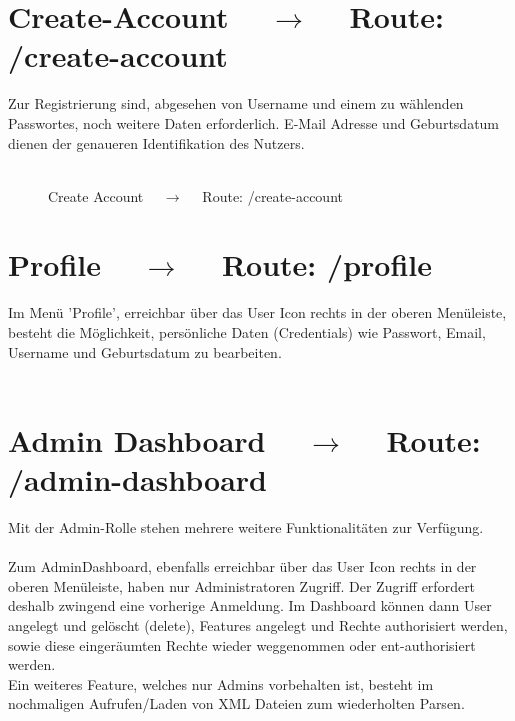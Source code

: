 \documentclass[10pt]{report}
\begin{document}
\section{Create-Account $\quad\rightarrow\quad$  Route:  /create-account}  	
	
\noindent  Zur Registrierung sind, abgesehen von Username und einem zu wählenden Passwortes, noch weitere Daten erforderlich. E-Mail Adresse und Geburtsdatum dienen der genaueren Identifikation des Nutzers.\\\\
\begin{figure}[H]
	\begin{center}		
  	 \end{center}
	\caption{Create Account $\quad\rightarrow\quad$  Route:  /create-account}	
 \end{figure}



\section{Profile $\quad\rightarrow\quad$  Route:  /profile}
Im Menü 'Profile', erreichbar über das User Icon rechts in der oberen Menüleiste, besteht die Möglichkeit, persönliche Daten (Credentials) wie Passwort, Email, Username und Geburtsdatum zu bearbeiten. \\\\

\section{Admin Dashboard $\quad\rightarrow\quad$  Route:  /admin-dashboard}
Mit der Admin-Rolle stehen mehrere weitere Funktionalitäten zur Verfügung.  \\\\
Zum AdminDashboard, ebenfalls erreichbar über das User Icon rechts in der oberen Menüleiste, haben nur Administratoren Zugriff. Der Zugriff erfordert deshalb zwingend eine vorherige Anmeldung. Im Dashboard können dann User angelegt und gelöscht (delete), Features angelegt und Rechte authorisiert werden, sowie diese eingeräumten Rechte wieder weggenommen oder ent-authorisiert werden. \\
Ein weiteres Feature, welches nur Admins vorbehalten ist, 
besteht im nochmaligen Aufrufen/Laden von XML Dateien zum wiederholten Parsen.\\\\
\end{document}
